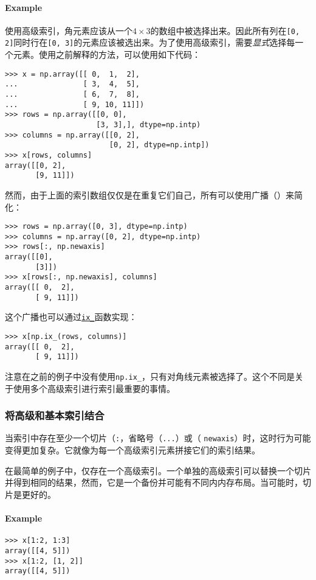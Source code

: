 \documentclass[../main.tex]{subfile}
\begin{document}
\paragraph{Example}使用高级索引，角元素应该从一个$4\times 3$的数组中被选择出来。因此所有列在\lstinline{[0, 2]}同时行在\lstinline{[0, 3]}的元素应该被选出来。为了使用高级索引，需要\textit{显式}选择每一个元素。使用之前解释的方法，可以使用如下代码：
\begin{lstlisting}
>>> x = np.array([[ 0,  1,  2],
...               [ 3,  4,  5],
...               [ 6,  7,  8],
...               [ 9, 10, 11]])
>>> rows = np.array([[0, 0],
                     [3, 3],], dtype=np.intp)
>>> columns = np.array([[0, 2], 
                        [0, 2], dtype=np.intp])
>>> x[rows, columns]
array([[0, 2], 
       [9, 11]])
\end{lstlisting}
然而，由于上面的索引数组仅仅是在重复它们自己，所有可以使用广播（）来简化：
\begin{lstlisting}
>>> rows = np.array([0, 3], dtype=np.intp)
>>> columns = np.array([0, 2], dtype=np.intp)
>>> rows[:, np.newaxis]
array([[0],
       [3]])
>>> x[rows[:, np.newaxis], columns]
array([[ 0,  2],
       [ 9, 11]])
\end{lstlisting}
这个广播也可以通过\href{https://numpy.org/doc/stable/reference/generated/numpy.ix_.html#numpy.ix_}{\lstinline{ix_}}函数实现：
\begin{lstlisting}
>>> x[np.ix_(rows, columns)]
array([[ 0,  2],
       [ 9, 11]])
\end{lstlisting}
注意在之前的例子中没有使用\lstinline{np.ix_}，只有对角线元素被选择了。这个不同是关于使用多个高级索引进行索引最重要的事情。

\subsubsection{将高级和基本索引结合}

当索引中存在至少一个切片（\lstinline{:}，省略号（\lstinline{...}）或（ \lstinline{newaxis}）时，这时行为可能变得更加复杂。它就像为每一个高级索引元素拼接它们的索引结果。

在最简单的例子中，仅存在一个高级索引。一个单独的高级索引可以替换一个切片并得到相同的结果，然而，它是一个备份并可能有不同内内存布局。当可能时，切片是更好的。

\paragraph{Example}
\begin{lstlisting}
>>> x[1:2, 1:3]
array([[4, 5]])
>>> x[1:2, [1, 2]]
array([[4, 5]])
\end{lstlisting}
\end{document}
